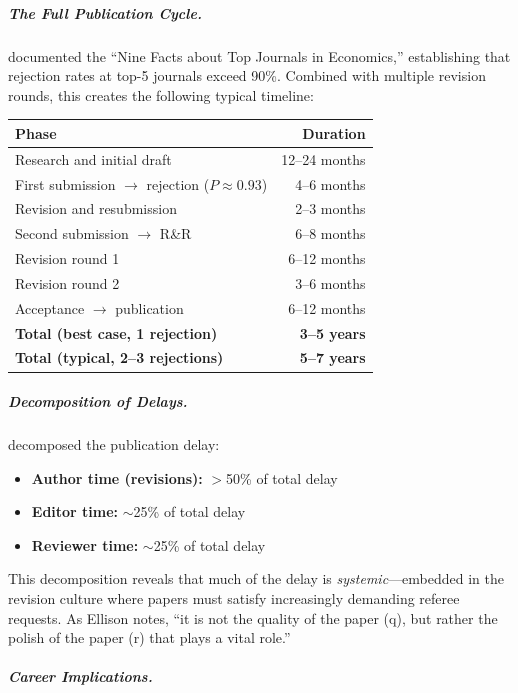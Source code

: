 \subparagraph{The Full Publication Cycle.}

\citet{card2013ninefacts} documented the ``Nine Facts about Top Journals in Economics,''
establishing that rejection rates at top-5 journals exceed 90\%. Combined with
multiple revision rounds, this creates the following typical timeline:

\begin{center}
\renewcommand{\arraystretch}{1.3}
\small
\begin{tabular}{@{}lr@{}}
\toprule
\textbf{Phase} & \textbf{Duration} \\
\midrule
Research and initial draft & 12--24 months \\
First submission $\to$ rejection ($P \approx 0.93$) & 4--6 months \\
Revision and resubmission & 2--3 months \\
Second submission $\to$ R\&R & 6--8 months \\
Revision round 1 & 6--12 months \\
Revision round 2 & 3--6 months \\
Acceptance $\to$ publication & 6--12 months \\
\midrule
\textbf{Total (best case, 1 rejection)} & \textbf{3--5 years} \\
\textbf{Total (typical, 2--3 rejections)} & \textbf{5--7 years} \\
\bottomrule
\end{tabular}
\end{center}

\subparagraph{Decomposition of Delays.}

\citet{ellison2002slowdown} decomposed the publication delay:
\begin{itemize}[nosep]
    \item \textbf{Author time (revisions):} $>$50\% of total delay
    \item \textbf{Editor time:} $\sim$25\% of total delay
    \item \textbf{Reviewer time:} $\sim$25\% of total delay
\end{itemize}

This decomposition reveals that much of the delay is \textit{systemic}---embedded in
the revision culture where papers must satisfy increasingly demanding referee requests.
As Ellison notes, ``it is not the quality of the paper (q), but rather the polish
of the paper (r) that plays a vital role.''

\subparagraph{Career Implications.}

